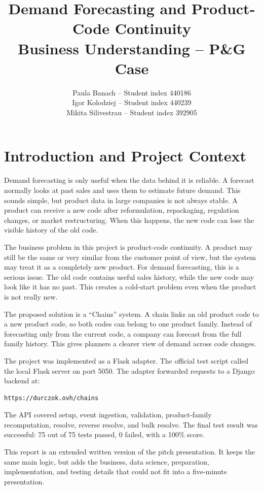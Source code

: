 \documentclass[12pt]{article}
\title{Demand Forecasting and Product-Code Continuity\\
\large Business Understanding -- P\&G Case}
\author{
Paula Banach -- Student index 440186\\
Igor Kolodziej -- Student index 440239\\
Mikita Silivestrau -- Student index 392905
}
\date{}
\begin{document}
\maketitle
\newpage

\section{Introduction and Project Context}

Demand forecasting is only useful when the data behind it is reliable. A forecast normally looks at past sales and uses them to estimate future demand. This sounds simple, but product data in large companies is not always stable. A product can receive a new code after reformulation, repackaging, regulation changes, or market restructuring. When this happens, the new code can lose the visible history of the old code.

The business problem in this project is product-code continuity. A product may still be the same or very similar from the customer point of view, but the system may treat it as a completely new product. For demand forecasting, this is a serious issue. The old code contains useful sales history, while the new code may look like it has no past. This creates a cold-start problem even when the product is not really new.

The proposed solution is a ``Chains'' system. A chain links an old product code to a new product code, so both codes can belong to one product family. Instead of forecasting only from the current code, a company can forecast from the full family history. This gives planners a clearer view of demand across code changes.

The project was implemented as a Flask adapter. The official test script called the local Flask server on port 5050. The adapter forwarded requests to a Django backend at:

\begin{lstlisting}
https://durczok.ovh/chains
\end{lstlisting}

The API covered setup, event ingestion, validation, product-family recomputation, resolve, reverse resolve, and bulk resolve. The final test result was successful: 75 out of 75 tests passed, 0 failed, with a 100\% score.

This report is an extended written version of the pitch presentation. It keeps the same main logic, but adds the business, data science, preparation, implementation, and testing details that could not fit into a five-minute presentation.
\end{document}
